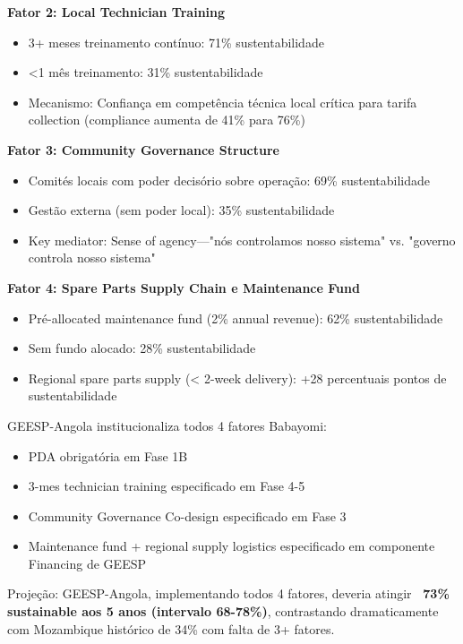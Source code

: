 \documentclass[12pt, a4paper]{article}
\begin{document}
\textbf{Fator 2: Local Technician Training}
\begin{itemize}
\item 3+ meses treinamento contínuo: 71\% sustentabilidade
\item <1 mês treinamento: 31\% sustentabilidade
\item Mecanismo: Confiança em competência técnica local crítica para tarifa collection (compliance aumenta de 41\% para 76\%)
\end{itemize}

\textbf{Fator 3: Community Governance Structure}
\begin{itemize}
\item Comités locais com poder decisório sobre operação: 69\% sustentabilidade
\item Gestão externa (sem poder local): 35\% sustentabilidade
\item Key mediator: Sense of agency—"nós controlamos nosso sistema" vs. "governo controla nosso sistema"
\end{itemize}

\textbf{Fator 4: Spare Parts Supply Chain e Maintenance Fund}
\begin{itemize}
\item Pré-allocated maintenance fund (2\% annual revenue): 62\% sustentabilidade
\item Sem fundo alocado: 28\% sustentabilidade
\item Regional spare parts supply (< 2-week delivery): +28 percentuais pontos de sustentabilidade
\end{itemize}

GEESP-Angola institucionaliza todos 4 fatores Babayomi:
\begin{itemize}
\item [$\checkmark$] PDA obrigatória em Fase 1B
\item [$\checkmark$] 3-mes technician training especificado em Fase 4-5
\item [$\checkmark$] Community Governance Co-design especificado em Fase 3
\item [$\checkmark$] Maintenance fund + regional supply logistics especificado em componente Financing de GEESP
\end{itemize}

Projeção: GEESP-Angola, implementando todos 4 fatores, deveria atingir \textbf{~73\% sustainable aos 5 anos (intervalo 68-78\%)}, contrastando dramaticamente com Mozambique histórico de 34\% com falta de 3+ fatores.
\end{document}
